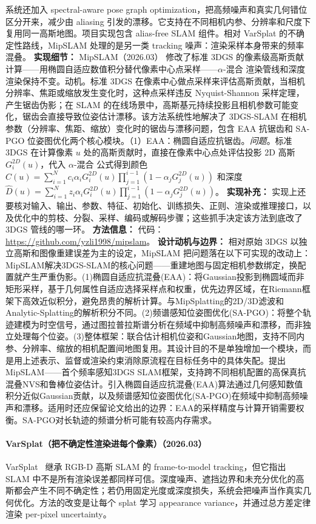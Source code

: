 系统还加入 spectral-aware pose graph optimization，把高频噪声和真实几何错位区分开来，减少由 aliasing 引发的漂移。它支持在不同相机内参、分辨率和尺度下复用同一高斯地图。项目实现包含 alias-free SLAM 组件。相对 VarSplat 的不确定性路线，MipSLAM 处理的是另一类 tracking 噪声：渲染采样本身带来的频率混叠。
\textbf{实现细节：} MipSLAM（2026.03） 修改了标准 3DGS 的像素级高斯贡献计算——用椭圆自适应数值积分替代像素中心点采样——$\alpha$-混合 渲染管线和深度渲染保持不变。动机。标准 3DGS 在像素中心做点采样来评估高斯贡献，当相机分辨率、焦距或缩放发生变化时，这种点采样违反 Nyquist-Shannon 采样定理，产生锯齿伪影；在 SLAM 的在线场景中，高斯基元持续投影且相机参数可能变化，锯齿会直接导致位姿估计漂移。该方法系统性地解决了 3DGS-SLAM 在相机参数（分辨率、焦距、缩放）变化时的锯齿与漂移问题，包含 EAA 抗锯齿和 SA-PGO 位姿图优化两个核心模块。（1）EAA：椭圆自适应抗锯齿。\textit{问题}。标准 3DGS 在计算像素 $u$ 处的高斯贡献时，直接在像素中心点处评估投影 2D 高斯 $G_i^{2D}(u)$，代入 $\alpha$-混合 公式得到颜色 $C(u) = \sum_{i=1}^{N} c_i \alpha_i G_i^{2D}(u) \prod_{j=1}^{i-1}(1 - \alpha_j G_j^{2D}(u))$ 和深度 $\hat{D}(u) = \sum_{i=1}^{N} z_i \alpha_i G_i^{2D}(u) \prod_{j=1}^{i-1}(1 - \alpha_j G_j^{2D}(u))$。
\textbf{实现补充：} 实现上还要核对输入、输出、参数、特征、初始化、训练损失、正则、渲染或推理接口，以及优化中的剪枝、分裂、采样、编码或解码步骤；这些抓手决定该方法到底改了 3DGS 管线的哪一环。
\textbf{方法信息：} 代码：\url{https://github.com/yzli1998/mipslam}。
\textbf{设计动机与边界：} 相对原始 3DGS 以独立高斯和图像重建误差为主的设定，MipSLAM 把问题落在以下可实现的改动上：MipSLAM解决3DGS-SLAM的核心问题——重建地图与固定相机参数绑定，换配置就产生严重伪影。(1)椭圆自适应抗混叠(EAA)：将Gaussian投影到椭圆域而非矩形采样，基于几何属性自适应选择采样点和权重，优先边界区域，在Riemann框架下高效近似积分，避免昂贵的解析计算。与MipSplatting的2D/3D滤波和Analytic-Splatting的解析积分不同。(2)频谱感知位姿图优化(SA-PGO)：将整个轨迹建模为时空信号，通过图拉普拉斯谱分析在频域中抑制高频噪声和漂移，而非独立处理每个位姿。(3)整体框架：联合估计相机位姿和Gaussian地图，支持不同内参、分辨率、缩放的相机配置间地图复用。其设计目的不是单独增加一个模块，而是用上述表示、监督或渲染约束消除原流程在目标任务中的具体失配。提出MipSLAM——首个频率感知3DGS SLAM框架，支持跨不同相机配置的高保真抗混叠NVS和鲁棒位姿估计。引入椭圆自适应抗混叠(EAA)算法通过几何感知数值积分近似Gaussian贡献，以及频谱感知位姿图优化(SA-PGO)在频域中抑制高频噪声和漂移。适用时还应保留论文给出的边界：EAA的采样精度与计算开销需要权衡。SA-PGO对长轨迹的频谱分析可能有较高内存需求。
\paragraph{VarSplat（把不确定性渲染进每个像素）（2026.03）}
VarSplat~\cite{2603_09673} 继承 RGB-D 高斯 SLAM 的 frame-to-model tracking，但它指出 SLAM 中不是所有渲染误差都同样可信。深度噪声、遮挡边界和未充分优化的高斯都会产生不同不确定性；若仍用固定光度或深度损失，系统会把噪声当作真实几何优化。方法的改变是让每个 splat 学习 appearance variance，并通过总方差定律渲染 per-pixel uncertainty。


